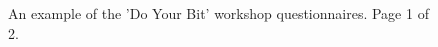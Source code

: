 \documentclass[12pt]{report} %
\begin{document}
\begin{figure}[t!]
    \centering
\caption{An example of the 'Do Your Bit' workshop questionnaires. Page 1 of 2. } 
\label{fig:QsP1}
\end{figure}
\end{document}
